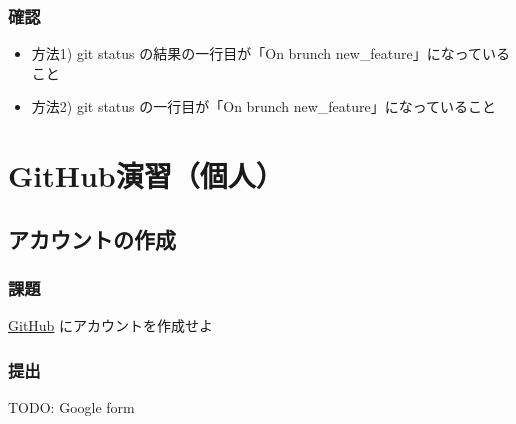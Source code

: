 \documentclass[a4paper,twoside,twocolumn]{bxjsarticle}
\begin{document}
\subsubsection{確認}
\label{sec-6-1-2}
\begin{itemize}
\item 方法1) git status の結果の一行目が「On brunch new\_feature」になっていること
\item 方法2) git status の一行目が「On brunch new\_feature」になっていること
\end{itemize}


\section{GitHub演習（個人）}
\label{sec-7}
\subsection{アカウントの作成}
\label{sec-7-1}
\subsubsection{課題}
\label{sec-7-1-1}
\href{https://github.com/}{GitHub} にアカウントを作成せよ
\subsubsection{提出}
\label{sec-7-1-2}
TODO: Google form
\end{document}
